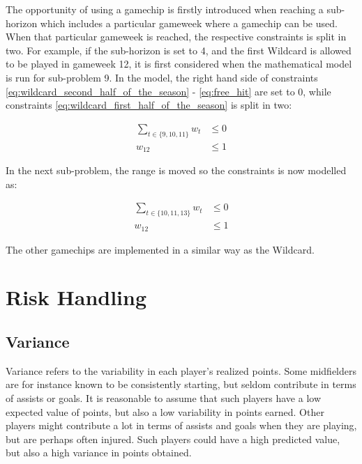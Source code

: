 \newpar


The opportunity of using a gamechip is firstly introduced when reaching a sub-horizon which includes a particular gameweek where a gamechip can be used. When that particular gameweek is reached, the respective constraints is split in two. For example, if the sub-horizon is set to 4, and the first Wildcard is allowed to be played in gameweek 12, it is first considered when the mathematical model is run for sub-problem 9. In the model, the right hand side of constraints \ref{eq:wildcard_second_half_of_the_season} - \ref{eq:free_hit} are set to 0, while constraints \ref{eq:wildcard_first_half_of_the_season} is split in two: 

\begin{equation*}
    \begin{aligned}
      \sum_{t \in \{9,10,11 \}} w_{t} & \leq 0 \\
         w_{12} & \leq 1
    \end{aligned}
\end{equation*}

In the next sub-problem, the range is moved so the constraints is now modelled as: 

\begin{equation*}
    \begin{aligned}
      \sum_{t \in \{10,11,13\}} w_{t} & \leq 0 \\
         w_{12} & \leq 1
    \end{aligned}
\end{equation*}

The other gamechips are implemented in a similar way as the Wildcard. 


\section{Risk Handling} \label{Ch.5_Variance_tradeoff}

\subsection{Variance}
Variance refers to the variability in each player's realized points. Some midfielders are for instance known to be consistently starting, but seldom contribute in terms of assists or goals. It is reasonable to assume that such players have a low expected value of points, but also a low variability in points earned. Other players might contribute a lot in terms of assists and goals when they are playing, but are perhaps often injured. Such players could have a high predicted value, but also a high variance in points obtained. \newpar

